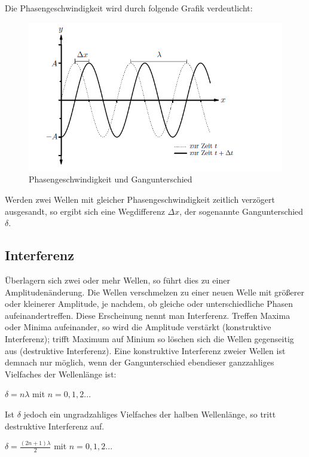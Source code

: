 \documentclass[12pt,a4paper,titlepage,headinclude,bibtotoc]{scrartcl}
\begin{document}
Die Phasengeschwindigkeit wird durch folgende Grafik verdeutlicht:

\begin{figure} [h]
\begin{center}
\includegraphics[scale=0.75]{Phasengeschwindigkeit2.png} \end{center}
\caption{Phasengeschwindigkeit und Gangunterschied}
\end{figure}

Werden zwei Wellen mit gleicher Phasengeschwindigkeit zeitlich verzögert ausgesandt, so ergibt sich eine Wegdifferenz $\Delta x$, der sogenannte Gangunterschied $\delta$. 

\subsection{Interferenz}
Überlagern sich zwei oder mehr Wellen, so führt dies zu einer Amplitudenänderung. Die Wellen verschmelzen zu einer neuen Welle mit größerer oder kleinerer Amplitude, je nachdem, ob gleiche oder unterschiedliche Phasen aufeinandertreffen. Diese Erscheinung nennt man Interferenz. Treffen Maxima oder Minima aufeinander, so wird die Amplitude verstärkt (konstruktive Interferenz); trifft Maximum auf Minium so löschen sich die Wellen gegenseitig aus (destruktive Interferenz). 
Eine konstruktive Interferenz zweier Wellen ist demnach nur möglich, wenn der Gangunterschied ebendieser ganzzahliges Vielfaches der Wellenlänge ist:\\
\par
$\delta=n \lambda$ mit $n = 0,1,2...$
\\
\par

Ist $\delta$ jedoch ein ungradzahliges Vielfaches der halben Wellenlänge, so tritt destruktive Interferenz auf. \\
\par
$\delta = \frac{(2n+1)\lambda}{2}$ mit $n=0,1,2...$
\\
\par
\end{document}
